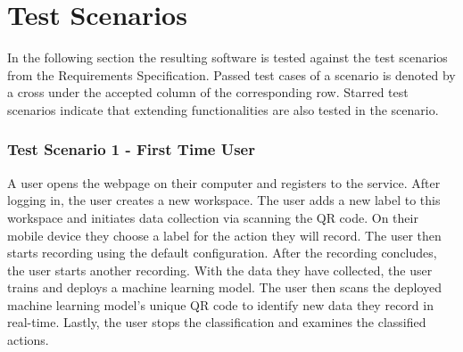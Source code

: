 \newcommand\VRule[1][\arrayrulewidth]{\vrule width #1}
\section{Test Scenarios}
In the following section the resulting software is tested against the test scenarios from the Requirements Specification. Passed test cases of a scenario is denoted by a cross under the accepted column of the corresponding row. Starred test scenarios indicate that extending functionalities are also tested in the scenario.
\subsubsection{Test Scenario 1 - First Time User}
A user opens the webpage on their computer and registers to the service. After logging in, the user creates a new workspace. The user adds a new label to this workspace and initiates data collection via scanning the QR code. On their mobile device they choose a label for the action they will record. The user then starts recording using the default configuration. After the recording concludes, the user starts another recording. With the data they have collected, the user trains and deploys a machine learning model. The user then scans the deployed machine learning model's unique QR code to identify new data they record in real-time. Lastly, the user stops the classification and examines the classified actions.
